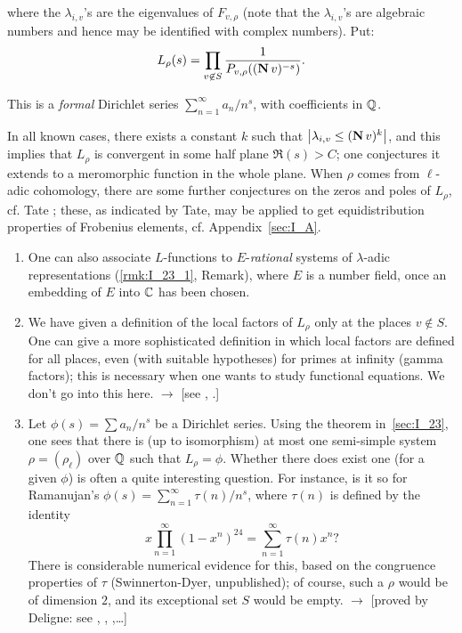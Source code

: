 where the $\lambda_{i,v}$'s are the eigenvalues of $F_{v,\rho}$ (note that the 
$\lambda_{i,v}$'s are algebraic numbers and hence may be identified with 
complex numbers). Put:
\[
L_\rho(s) = \prod_{v \not\in S} \frac{1}{P_{v,\rho}((\operatorname{\mathbf{N}} v)^{-s})}.
\]

This is a \emph{formal} Dirichlet series $\sum_{n=1}^{\infty} a_n / n^s$, with 
coefficients in $\mathbb{Q}$.

In all known cases, there exists a constant $k$ such that $\left|{\lambda_{i,v} 
\leq (\operatorname{\mathbf{N}} v)^k}\right|$, and this implies that $L_\rho$ is convergent in 
some half plane $\Re(s) > C$; one conjectures it extends to a meromorphic 
function in the whole plane.
\dpage
When $\rho$ comes from $\ell$-adic cohomology, 
there are some further conjectures on the zeros and poles of $L_\rho$, cf. Tate 
\cite{36}; these, as indicated by Tate, may be applied to get equidistribution 
properties of Frobenius elements, cf. Appendix~\ref{sec:I_A}.

\begin{obs}
\begin{enumerate}
	\item\label{rmk:I_24_1} One can also associate $L$-functions to $E$-\emph{rational} systems of $\lambda$-adic representations (\ref{rmk:I_23_1}, Remark), where $E$ is a number field, once an embedding of $E$ into $\mathbb{C}$ has been chosen.
	\item We have given a definition of the local factors of $L_\rho$ only at 
	the places $v \not\in S$. One can give a more sophisticated definition in 
	which local factors are defined for all places, even (with suitable 
	hypotheses) for primes at infinity (gamma factors); this is necessary when 
	one wants to study functional equations. We don't go into this here. 
	$\rightarrow$ [see \cite{51}, \cite{74}.]
	
	\item Let $\phi(s) = \sum a_n / n^s $ be a Dirichlet series. Using the 
	theorem in~\ref{sec:I_23}, one sees that there is (up to isomorphism) at 
	most one semi-simple system $\rho = (\rho_\ell)$ over $\mathbb{Q}$ such that 
	$L_\rho = \phi$. Whether there does exist one (for a given $\phi$) is often a quite interesting question. For instance, is it so for Ramanujan's $\phi(s) = \sum_{n = 1}^{\infty} \tau(n)/n^s$, where $\tau(n)$ is defined by the identity
	\[
	x \prod_{n=1}^{\infty}(1 - x^n)^24 = \sum_{n=1}^{\infty}\tau(n)x^n ?
	\]
	There is considerable numerical evidence for this, based on the congruence 
	properties of $\tau$ (Swinnerton-Dyer, unpublished); of course,
	such a $\rho$ would be of dimension $2$, and its exceptional set $S$ would be empty. $\rightarrow$ [proved by Deligne: see \cite{49}, \cite{50}, \cite{65},\dots]
\end{enumerate}
\end{obs}

